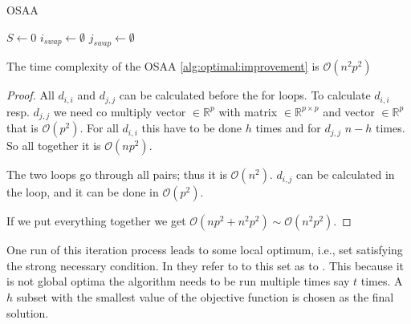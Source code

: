 \begin{algorithm}[H]
    \label{alg:optimal:improvement}
    \caption{OSAA}
    
    $S \gets 0$\;
    $i_{swap} \gets \emptyset$\;
    $j_{swap} \gets \emptyset$\;

    \;
\end{algorithm}


\begin{observation} 
     The time complexity of the OSAA \ref{alg:optimal:improvement} is $\mathcal{O}(n^2p^2)$
\end{observation} 


\begin{proof}
All $d_{i,i}$ and $d_{j,j}$ can be calculated before the for loops. 
To calculate $d_{i,i}$ resp. $d_{j,j}$ we need co multiply vector $\in \mathbb{R}^p$ with matrix  $\in \mathbb{R}^{p \times p}$ and vector $\in \mathbb{R}^p$ that is $\mathcal{O}(p^2)$. For all $d_{i,i}$ this have to be done $h$ times and for $d_{j,j}$ $n-h$ times. So all together it is $\mathcal{O}(np^2)$. 

The two loops go through all pairs; thus it is $\mathcal{O}(n^2)$. $d_{i,j}$ can be calculated in the loop, and it can be done in $\mathcal{O}(p^2)$.

If we put everything together we get 
$\mathcal{O}(np^2 + n^2p^2) \sim \mathcal{O}(n^2p^2)$.
\end{proof}


One run of this iteration process leads to some local optimum, i.e., set satisfying the strong necessary condition. In \cite{hawkins:1994} they refer to to this set as to .
This because it is not global optima the algorithm needs to be run multiple times say $t$ times. A $h$  subset with the smallest value of the objective function is chosen as the final solution.

